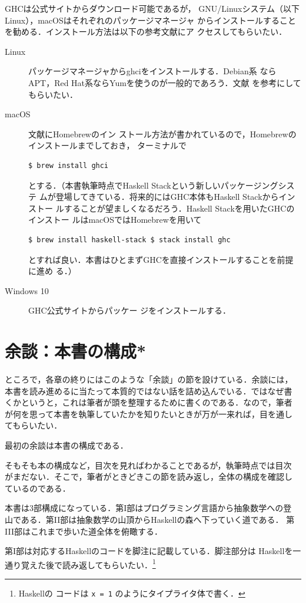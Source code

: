 \documentclass[a5paper,twoside,fleqn,draft]{jsbook}
\newcommand{\programminglanguage}[1]{\textsf{#1}}
\newcommand{\haskell}{\programminglanguage{Haskell}}
\newcommand{\code}[1]{\texttt{#1}}
\begin{document}
GHCは公式サイト\cite{haskellplatform}からダウンロード可能であるが，
GNU/Linuxシステム（以下Linux），macOSはそれぞれのパッケージマネージャ
からインストールすることを勧める．インストール方法は以下の参考文献にア
クセスしてもらいたい．
\begin{description}
\item[Linux] パッケージマネージャからghciをインストールする．Debian系
  ならAPT，Red Hat系ならYumを使うのが一般的であろう．文献\cite{linux}
  を参考にしてもらいたい．\item[macOS] 文献\cite{osx}にHomebrewのイン
  ストール方法が書かれているので，Homebrewのインストールまでしておき，
  ターミナルで
\begin{verbatim}
$ brew install ghci
\end{verbatim} %
とする．（本書執筆時点でHaskell Stackという新しいパッケージングシステ
  ムが登場してきている．将来的にはGHC本体もHaskell Stackからインストー
  ルすることが望ましくなるだろう．Haskell Stackを用いたGHCのインストー
  ルはmacOSではHomebrewを用いて
\begin{verbatim}
$ brew install haskell-stack $ stack install ghc
\end{verbatim} %
とすれば良い．本書はひとまずGHCを直接インストールすることを前提に進め
る．）\item[Windows 10] GHC公式サイト\cite{haskellplatform}からパッケー
ジをインストールする．
\end{description}


\section{余談：本書の構成*}

ところで，各章の終りにはこのような「余談」の節を設けている．余談には，
本書を読み進めるに当たって本質的ではない話を詰め込んでいる．ではなぜ書
くかというと，これは筆者が頭を整理するために書くのである．なので，筆者
が何を思って本書を執筆していたかを知りたいときが万が一来れば，目を通し
てもらいたい．

最初の余談は本書の構成である．

そもそも本の構成など，目次を見ればわかることであるが，執筆時点では目次
がまだない．そこで，筆者がときどきこの節を読み返し，全体の構成を確認し
ているのである．

本書は3部構成になっている．第I部はプログラミング言語から抽象数学への登
山である．第II部は抽象数学の山頂から\haskell の森へ下っていく道である．
第III部はこれまで歩いた道全体を俯瞰する．

第I部は対応する\haskell のコードを脚注に記載している．脚注部分は
\haskell を一通り覚えた後で読み返してもらいたい．\footnote{\haskell の
  コードは \code{x = 1} のようにタイプライタ体で書く．}
\end{document}

